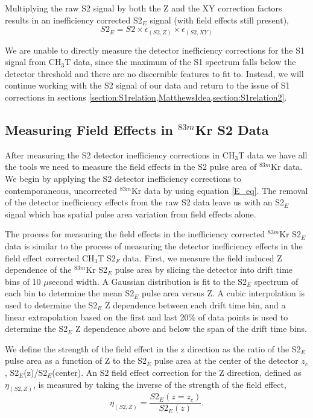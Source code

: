 Multiplying the raw S2 signal by both the Z and the XY correction factors results in an inefficiency corrected S2$_E$ signal (with field effects still present), 
\begin{equation}\label{E_eq}
S2_E =S2 \times \epsilon_{(S2,Z)} \times \epsilon_{(S2,XY)} 
\end{equation}

We are unable to directly measure the detector inefficiency corrections for the S1 signal from CH$_3$T data, since the maximum of the S1 spectrum falls below the detector threshold and there are no discernible features to fit to. Instead, we will continue working with the S2 signal of our data and return to the issue of S1 corrections in sections \ref{section:S1relation,MatthewsIdea,section:S1relation2}.


 
\subsection{Measuring Field Effects in $^{83m}$Kr S2 Data} \label{section:FieldEffects}

After measuring the S2 detector inefficiency corrections in CH$_3$T data we have all the tools we need to measure the field effects in the S2 pulse area of $^{83m}$Kr data.  We begin by applying the S2 detector inefficiency corrections to contemporaneous,  uncorrected $^{83m}$Kr data by using equation \ref{E_eq}.  The removal of the detector inefficiency effects from the raw S2 data leave us with an S2$_E$ signal which has spatial pulse area variation from field effects alone.

The process for measuring the field effects in the inefficiency corrected $^{83m}$Kr S2$_E$ data is similar to the process of measuring the detector inefficiency effects in the field effect corrected CH$_3$T S2$_F$ data.  First, we measure the field induced Z dependence of the $^{83m}$Kr S2$_E$ pulse area by slicing the detector into drift time bins of 10 $\mu$second width.  A Gaussian distribution is fit to the S2$_E$ spectrum of each bin to determine the mean S2$_E$ pulse area versus Z.   A cubic interpolation is used to determine the S2$_E$ Z dependence between each drift time bin, and a linear extrapolation based on the first and last 20\% of data points is used to determine the S2$_E$ Z dependence above and below the span of the drift time bins.  

We define the strength of the field effect in the z direction as the ratio of the S2$_E$ pulse area as a function of Z to the S2$_E$ pulse area at the center of the detector $z_c$, S2$_E$(z)/S2$_E$(center).  An S2 field effect correction for the Z direction, defined as $\eta_{(S2,Z)}$, is measured by taking the inverse of the strength of the field effect, 
\begin{equation}
\eta_{(S2,Z)} = \frac{S2_E(z=z_c)}{S2_E(z)}.
\end{equation} 

